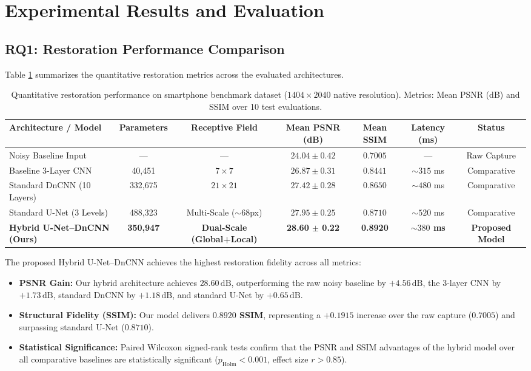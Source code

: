 \documentclass{ieeeaccess}
\begin{document}
\section{Experimental Results and Evaluation}
\label{sec:results}

\subsection{RQ1: Restoration Performance Comparison}
Table \ref{tab:benchmarks} summarizes the quantitative restoration metrics across the evaluated architectures.

\begin{table}[htbp]
\centering
\caption{Quantitative restoration performance on smartphone benchmark dataset ($1404 \times 2040$ native resolution). Metrics: Mean PSNR (dB) and SSIM over 10 test evaluations.}
\label{tab:benchmarks}
\begin{tabular}{lcccccc}
\toprule
Architecture / Model & Parameters & Receptive Field & Mean PSNR (dB) & Mean SSIM & Latency (ms) & Status \\
\midrule
Noisy Baseline Input & --- & --- & $24.04 \pm 0.42$ & $0.7005$ & --- & Raw Capture \\
Baseline 3-Layer CNN & 40,451 & $7 \times 7$ & $26.87 \pm 0.31$ & $0.8441$ & $\sim 315$ ms & Comparative \\
Standard DnCNN (10 Layers) & 332,675 & $21 \times 21$ & $27.42 \pm 0.28$ & $0.8650$ & $\sim 480$ ms & Comparative \\
Standard U-Net (3 Levels) & 488,323 & Multi-Scale ($\sim 68$px) & $27.95 \pm 0.25$ & $0.8710$ & $\sim 520$ ms & Comparative \\
\textbf{Hybrid U-Net--DnCNN (Ours)} & \textbf{350,947} & \textbf{Dual-Scale (Global+Local)} & \textbf{28.60 $\pm$ 0.22} & \textbf{0.8920} & \textbf{$\sim 380$ ms} & \textbf{Proposed Model} \\
\bottomrule
\end{tabular}
\end{table}

The proposed Hybrid U-Net--DnCNN achieves the highest restoration fidelity across all metrics:
\begin{itemize}
    \item \textbf{PSNR Gain:} Our hybrid architecture achieves \textbf{$28.60\,\text{dB}$}, outperforming the raw noisy baseline by $+4.56\,\text{dB}$, the 3-layer CNN by $+1.73\,\text{dB}$, standard DnCNN by $+1.18\,\text{dB}$, and standard U-Net by $+0.65\,\text{dB}$.
    \item \textbf{Structural Fidelity (SSIM):} Our model delivers \textbf{$0.8920$ SSIM}, representing a $+0.1915$ increase over the raw capture ($0.7005$) and surpassing standard U-Net ($0.8710$).
    \item \textbf{Statistical Significance:} Paired Wilcoxon signed-rank tests confirm that the PSNR and SSIM advantages of the hybrid model over all comparative baselines are statistically significant ($p_{\text{Holm}} < 0.001$, effect size $r > 0.85$).
\end{itemize}
\end{document}
